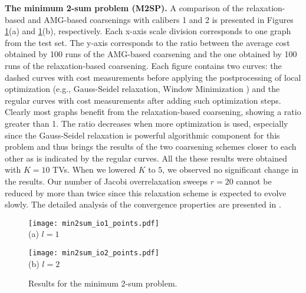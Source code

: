 \documentclass[final]{siamltex}
\begin{document}
\par {\bf The minimum 2-sum problem (M2SP).} A comparison of the relaxation-based and AMG-based
coarsenings with calibers 1 and 2 is presented in Figures
\ref{fig:2sum}(a) and \ref{fig:2sum}(b), respectively. Each x-axis
scale division corresponds to one graph from the test set. The
y-axis corresponds to the ratio between the average cost obtained by 100
runs of the AMG-based coarsening and the one obtained by 100 runs of
the relaxation-based coarsening. Each figure contains two curves:
the dashed curves with cost measurements before applying the postprocessing of local optimization (e.g., Gauss-Seidel
relaxation, Window Minimization \cite{safro2004}) and the regular curves with cost measurements
after adding such optimization steps.
Clearly most graphs benefit from
the relaxation-based coarsening, showing a ratio greater than 1. The ratio
decreases when more optimization is used, especially since the
Gauss-Seidel relaxation is powerful algorithmic component for this problem and thus
brings the results of the two coarsening schemes closer to each
other as is indicated by the regular curves. All the these results
were obtained with $K=10$ TVs. When we lowered $K$ to $5$, we observed no significant change in the results. Our number of
Jacobi overrelaxation sweeps $r=20$ cannot be reduced by more than twice
since this relaxation scheme is expected to evolve slowly. The detailed analysis of the convergence properties are presented in \cite{chen-safro-algdist-full}.


\begin{figure}[h]
\begin{minipage}[b]{0.5\linewidth} \centering
\texttt{[image: min2sum\_io1\_points.pdf]}\\
(a) $l=1$
\end{minipage}
\hspace{0.5cm} \begin{minipage}[b]{0.5\linewidth}
\centering
\texttt{[image: min2sum\_io2\_points.pdf]}\\
(b) $l=2$
\end{minipage}
\caption{Results for the minimum 2-sum problem.}\label{fig:2sum}
\end{figure}
\end{document}
